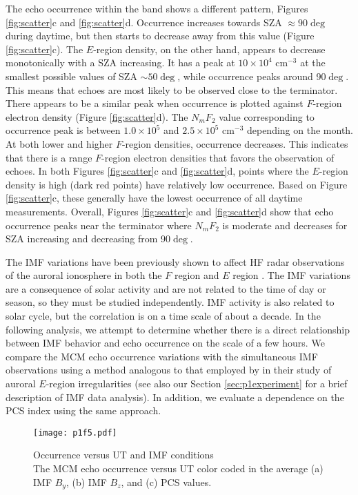The echo occurrence within the band shows a different pattern, Figures \ref{fig:scatter}c and \ref{fig:scatter}d. Occurrence increases towards SZA \(\approx90\deg\) during daytime, but then starts to decrease away from this value (Figure \ref{fig:scatter}c). The $E$-region density, on the other hand, appears to decrease monotonically with a SZA increasing. It has a peak at \(10 \times 10^4\) cm\(^{-3}\) at the smallest possible values of SZA \(\sim50\deg\), while occurrence peaks around 90\(\deg\). This means that echoes are most likely to be observed close to the terminator. There appears to be a similar peak when occurrence is plotted against \(F\)-region electron density (Figure \ref{fig:scatter}d). The \(N_mF_2\) value corresponding to occurrence peak is between \(1.0\times 10^5\) and \(2.5\times 10^5\) cm\(^{-3}\) depending on the month.  At both lower and higher \(F\)-region densities, occurrence decreases. This indicates that there is a range \(F\)-region electron densities that favors the observation of echoes. In both Figures \ref{fig:scatter}c and \ref{fig:scatter}d, points where the \(E\)-region density is high (dark red points) have relatively low occurrence.  Based on Figure \ref{fig:scatter}c, these generally have the lowest occurrence of all daytime measurements.  Overall, Figures \ref{fig:scatter}c and \ref{fig:scatter}d show that echo occurrence peaks near the terminator where \(N_mF_2\) is moderate and decreases for SZA increasing and decreasing from 90\(\deg\).

The IMF variations have been previously shown to affect HF radar observations of the auroral ionosphere in both the \(F\) region \citep{Ballatore2001} and \(E\) region \citep{Makarevich2012}. The IMF variations are a consequence of solar activity and are not related to the time of day or season, so they must be studied independently. IMF activity is also related to solar cycle, but the correlation is on a time scale of about a decade. In the following analysis, we attempt to determine whether there is a direct relationship between IMF behavior and echo occurrence on the scale of a few hours. We compare the MCM echo occurrence variations with the simultaneous IMF observations using a method analogous to that employed by \citet{Makarevich2012} in their study of auroral \(E\)-region irregularities (see also our Section \ref{sec:p1experiment} for a brief description of IMF data analysis).  In addition, we evaluate a dependence on the PCS index using the same approach.

\begin{figure}
	\centering
	\texttt{[image: p1f5.pdf]}
	\caption[Occurrence versus UT and IMF conditions]{{\:}Occurrence versus UT and IMF conditions\\ The MCM echo occurrence versus UT color coded in the average (a) IMF \(B_y\), (b) IMF \(B_z\), and (c) PCS values.}
	\label{fig:ut_occ}
\end{figure}

